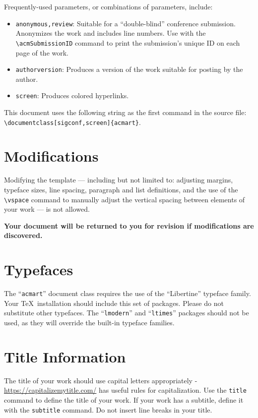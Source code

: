 \documentclass[sigconf]{acmart}
\begin{document}
Frequently-used parameters, or combinations of parameters, include:
\begin{itemize}
\item {\verb|anonymous,review|}: Suitable for a ``double-blind'' conference submission. Anonymizes the work and includes line numbers. Use with the \verb|\acmSubmissionID| command to print the submission's unique ID on each page of the work.
\item{\verb|authorversion|}: Produces a version of the work suitable for posting by the author.
\item{\verb|screen|}: Produces colored hyperlinks.
\end{itemize}

This document uses the following string as the first command in the source file: \verb|\documentclass[sigconf,screen]{acmart}|.

\section{Modifications}

Modifying the template --- including but not limited to: adjusting margins, typeface sizes, line spacing, paragraph and list definitions, and the use of the \verb|\vspace| command to manually adjust the vertical spacing between elements of your work --- is not allowed.

{\bf Your document will be returned to you for revision if modifications are discovered.}

\section{Typefaces}

The ``\verb|acmart|'' document class requires the use of the ``Libertine'' typeface family. Your \TeX\ installation should include this set of packages. Please do not substitute other typefaces. The ``\verb|lmodern|'' and ``\verb|ltimes|'' packages should not be used, as they will override the built-in typeface families.

\section{Title Information}

The title of your work should use capital letters appropriately - \url{https://capitalizemytitle.com/} has useful rules for capitalization. Use the {\verb|title|} command to define the title of your work. If your work has a subtitle, define it with the {\verb|subtitle|} command.
Do not insert line breaks in your title.
\end{document}
